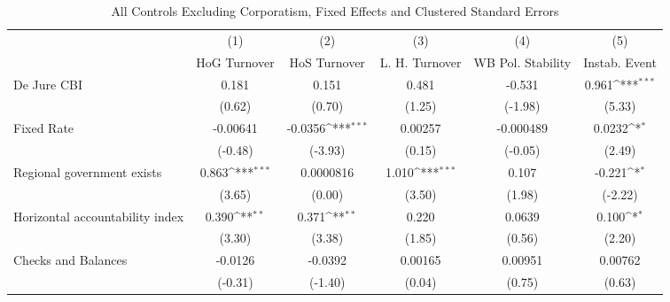 \begin{table}[htbp]\centering
\def\sym#1{\ifmmode^{#1}\else\(^{#1}\)\fi}
\caption{All Controls Excluding Corporatism, Fixed Effects and Clustered Standard Errors \label{nccmultIndFEDJ}}
\begin{tabular}{l*{5}{c}}
\toprule
                                        &\multicolumn{1}{c}{(1)}&\multicolumn{1}{c}{(2)}&\multicolumn{1}{c}{(3)}&\multicolumn{1}{c}{(4)}&\multicolumn{1}{c}{(5)}\\
                                        &\multicolumn{1}{c}{HoG Turnover}&\multicolumn{1}{c}{HoS Turnover}&\multicolumn{1}{c}{L. H. Turnover}&\multicolumn{1}{c}{WB Pol. Stability}&\multicolumn{1}{c}{Instab. Event}\\
\midrule
De Jure CBI                             &    0.181         &    0.151         &    0.481         &   -0.531         &    0.961\sym{***}\\
                                        &   (0.62)         &   (0.70)         &   (1.25)         &  (-1.98)         &   (5.33)         \\
\addlinespace
Fixed Rate                              & -0.00641         &  -0.0356\sym{***}&  0.00257         &-0.000489         &   0.0232\sym{*}  \\
                                        &  (-0.48)         &  (-3.93)         &   (0.15)         &  (-0.05)         &   (2.49)         \\
\addlinespace
Regional government exists              &    0.863\sym{***}&0.0000816         &    1.010\sym{***}&    0.107         &   -0.221\sym{*}  \\
                                        &   (3.65)         &   (0.00)         &   (3.50)         &   (1.98)         &  (-2.22)         \\
\addlinespace
Horizontal accountability index         &    0.390\sym{**} &    0.371\sym{**} &    0.220         &   0.0639         &    0.100\sym{*}  \\
                                        &   (3.30)         &   (3.38)         &   (1.85)         &   (0.56)         &   (2.20)         \\
\addlinespace
Checks and Balances                     &  -0.0126         &  -0.0392         &  0.00165         &  0.00951         &  0.00762         \\
                                        &  (-0.31)         &  (-1.40)         &   (0.04)         &   (0.75)         &   (0.63)         \\

\end{tabular}
\end{table}
